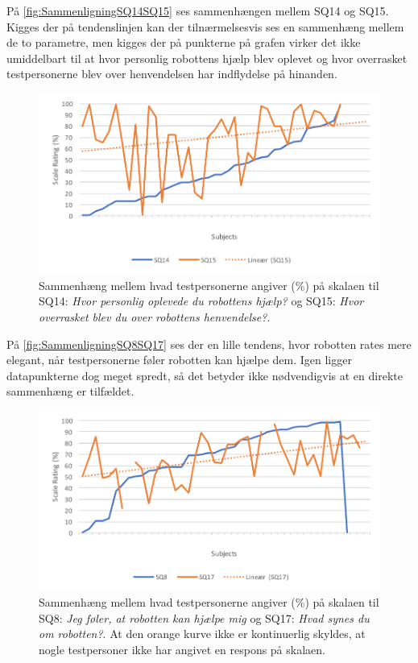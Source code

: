 \noindent
%
På \autoref{fig:SammenligningSQ14SQ15} ses sammenhængen mellem SQ14 og SQ15. Kigges der på tendenslinjen kan der tilnærmelsesvis ses en sammenhæng mellem de to parametre, men kigges der på punkterne på grafen virker det ikke umiddelbart til at hvor personlig robottens hjælp blev oplevet og hvor overrasket testpersonerne blev over henvendelsen har indflydelse på hinanden.
%
\begin{figure}[H]
	\centering
	\includegraphics[width=\textwidth]{Figure/Korrelationsgrafer/SQ14+SQ15}
	\caption{Sammenhæng mellem hvad testpersonerne angiver (\%) på skalaen til SQ14: \textit{Hvor personlig oplevede du robottens hjælp?} og SQ15: \textit{Hvor overrasket blev du over robottens henvendelse?}.}
	\label{fig:SammenligningSQ14SQ15}
\end{figure}
\noindent
%
På \autoref{fig:SammenligningSQ8SQ17} ses der en lille tendens, hvor robotten rates mere elegant, når testpersonerne føler robotten kan hjælpe dem. Igen ligger datapunkterne dog meget spredt, så det betyder ikke nødvendigvis at en direkte sammenhæng er tilfældet. 
%
\begin{figure}[H]
	\centering
	\includegraphics[width=\textwidth]{Figure/Korrelationsgrafer/SQ8+SQ17}
	\caption{Sammenhæng mellem hvad testpersonerne angiver (\%) på skalaen til SQ8: \textit{Jeg føler, at robotten kan hjælpe mig} og SQ17: \textit{Hvad synes du om robotten?}. At den orange kurve ikke er kontinuerlig skyldes, at nogle testpersoner ikke har angivet en respons på skalaen.}
	\label{fig:SammenligningSQ8SQ17}
\end{figure}
